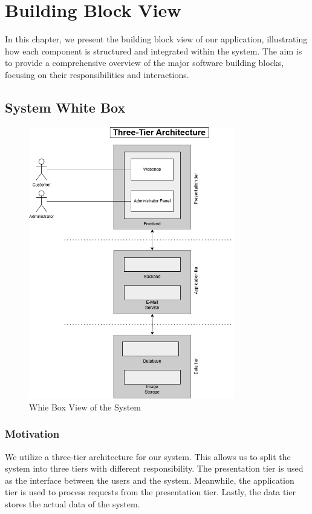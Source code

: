 \hypertarget{section-building-block-view}{%
\section{Building Block View}\label{section-building-block-view}}
In this chapter, we present the building block view of our application, illustrating how each component is structured and integrated within the system. The aim is to provide a comprehensive overview of the major software building blocks, focusing on their responsibilities and interactions.
\subsection{System White Box}
\begin{figure}[H]
    \centering
    \includegraphics[width=0.8\textwidth]{images/building_block_system_whitebox.png}
    \caption{Whie Box View of the System}
\end{figure}

\subsubsection{Motivation}
We utilize a three-tier architecture for our system.
This allows us to split the system into three tiers with different responsibility.
The presentation tier is used as the interface between the users and the system.
Meanwhile, the application tier is used to process requests from the presentation tier.
Lastly, the data tier stores the actual data of the system.


